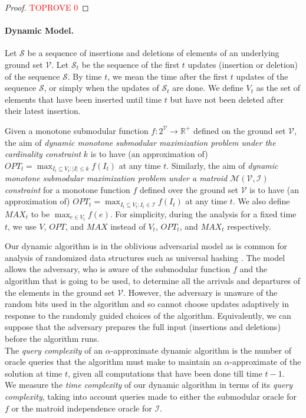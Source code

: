 \documentclass[11pt]{article}
\newcommand{\REAL}{\ensuremath{\mathbb{R}}}
\newcommand{\mI}{{\mathcal{I}}}
\newcommand{\matroid}{\mathcal{M}(\ground,\mathcal{I})}
\newcommand{\ground}{\ensuremath{\mathcal{V}}}
\begin{document}
\begin{proof}\textcolor{red}{TOPROVE 0}\end{proof}




\paragraph{Dynamic Model.}
Let $\mathcal{S}$ be a sequence of insertions and deletions of elements of an underlying ground set $\ground$.
Let $\mathcal{S}_t$ be the sequence of the first $t$ updates (insertion or deletion) of the sequence $\mathcal{S}$.
By time $t$, we mean the time after the first $t$ updates of the sequence $\mathcal{S}$, or simply when the updates of $\mathcal{S}_t$ are done. 
We define $V_t$ as the set of elements that have been inserted until time $t$ but have not been deleted after their latest insertion. 

Given a monotone submodular function  $f: 2^{\ground} \rightarrow \REAL^+$ defined on the ground set $\ground$, the aim of \emph{dynamic monotone submodular maximization problem under the cardinality constraint} $k$ is to have (an approximation of) $OPT_t = \max_{I_t \subseteq V_t: |I| \le k} f(I_t)$ at any time $t$. Similarly, the aim of \emph{dynamic monotone submodular maximization problem under a matroid $\matroid$ constraint} for a monotone function $f$ defined over the ground set $\ground$ is to have (an approximation of) $OPT_t=\max_{I_t \subseteq V_t: I_t\in \mathcal{I}}  f(I_t)$ at any time $t$. We also define $MAX_t$ to be $\max_{e \in V_t} f(e)$.
For simplicity, during the analysis for a fixed time $t$, we use $V$, $OPT$, and $MAX$ instead of $V_t$, $OPT_t$, and $MAX_t$ respectively.

Our dynamic algorithm is in the oblivious adversarial model as is common for analysis of randomized data structures such as universal hashing \cite{DBLP:conf/stoc/CarterW77}. 
The model allows the adversary, who is aware of the submodular function $f$ and the algorithm that is going to be used, to determine all the arrivals and departures of the elements in the ground set $\ground$.
However, the adversary is unaware of the random bits used in the algorithm and so cannot choose updates adaptively in response to the randomly guided choices of the algorithm. Equivalently, we can suppose that the adversary prepares the full input (insertions and deletions) before the algorithm runs. \\
The \emph{query complexity} of an $\alpha$-approximate dynamic algorithm is the number of oracle queries that the algorithm must make to 
maintain an $\alpha$-approximate of the solution at time $t$, given all computations that have been done 
till time $t-1$.\\
We measure the \emph{time complexity} of our dynamic algorithm 
in terms of its \emph{query complexity}, taking into account queries made to either the submodular oracle for $f$ or the matroid independence oracle for $\mI$. 
\end{document}
